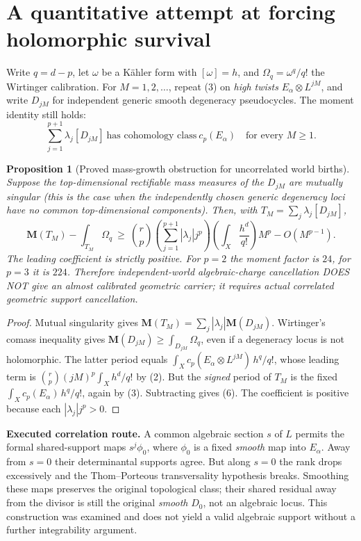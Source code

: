 \documentclass[11pt]{article}
\newtheorem{proposition}[theorem]{Proposition}
\newcommand{\Mass}{\mathbf M}
\begin{document}
\section{A quantitative attempt at forcing holomorphic survival}
Write \(q=d-p\), let \(\omega\) be a K\"ahler form with \([\omega]=h\), and \(\Omega_q=\omega^q/q!\) the Wirtinger calibration. For \(M=1,2,\ldots\), repeat (3) on \emph{high twists} \(E_\alpha\otimes L^{jM}\), and write \(D_{jM}\) for independent generic smooth degeneracy pseudocycles. The moment identity still holds:
\[
\sum_{j=1}^{p+1}\lambda_j[D_{jM}]\ \text{has cohomology class}\ c_p(E_\alpha)
\quad\text{for every }M\ge1.
\]
\begin{proposition}[Proved mass-growth obstruction for uncorrelated world births]
Suppose the top-dimensional rectifiable mass measures of the \(D_{jM}\) are mutually singular (this is the case when the independently chosen generic degeneracy loci have no common top-dimensional components). Then, with \(T_M=\sum_j\lambda_j[D_{jM}]\),
\[
\boxed{
\Mass(T_M)-\int_{T_M}\Omega_q
\ \ge\
\binom rp\!\left(\sum_{j=1}^{p+1}|\lambda_j|j^p\right)
\left(\int_X\frac{h^d}{q!}\right)M^p-O(M^{p-1}).
}\tag{6}
\]
The leading coefficient is strictly positive. For \(p=2\) the moment factor is \(24\), for \(p=3\) it is \(224\). Therefore independent-world algebraic-charge cancellation DOES NOT give an almost calibrated geometric carrier; it requires actual \emph{correlated geometric support cancellation}.
\end{proposition}
\begin{proof}
Mutual singularity gives \(\Mass(T_M)=\sum_j|\lambda_j|\Mass(D_{jM})\). Wirtinger's comass inequality gives \(\Mass(D_{jM})\ge\int_{D_{jM}}\Omega_q\), even if a degeneracy locus is not holomorphic. The latter period equals \(\int_Xc_p(E_\alpha\otimes L^{jM})\,h^q/q!\), whose leading term is \(\binom rp(jM)^p\int_Xh^d/q!\) by (2). But the \emph{signed} period of \(T_M\) is the fixed \(\int_Xc_p(E_\alpha)\,h^q/q!\), again by (3). Subtracting gives (6). The coefficient is positive because each \(|\lambda_j|j^p>0\).
\end{proof}

\noindent\textbf{Executed correlation route.} A common algebraic section \(s\) of \(L\) permits the formal shared-support maps \(s^j\phi_0\), where \(\phi_0\) is a fixed \emph{smooth} map into \(E_\alpha\). Away from \(s=0\) their determinantal supports agree. But along \(s=0\) the rank drops excessively and the Thom--Porteous transversality hypothesis breaks. Smoothing these maps preserves the original topological class; their shared residual away from the divisor is still the original \emph{smooth} \(D_0\), not an algebraic locus. This construction was examined and does not yield a valid algebraic support without a further integrability argument.
\end{document}
